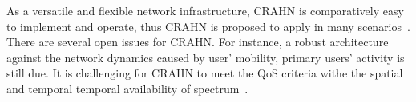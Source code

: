 As a versatile and flexible network infrastructure, CRAHN is comparatively easy to implement and operate, thus CRAHN is proposed to apply in many scenarios~\cite{Akyildiz09}.
There are several open issues for CRAHN.
For instance, a robust architecture against the network dynamics caused by user' mobility, primary users' activity is still due.
It is challenging for CRAHN to meet the QoS criteria withe the spatial and temporal temporal availability of spectrum~\cite{Mansoor2014}.




%
%
%
